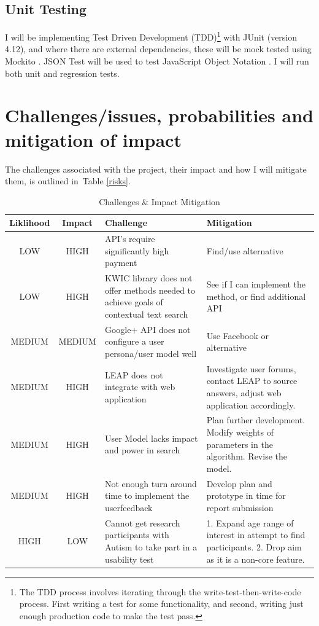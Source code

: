 \documentclass[a4paper, 11pt]{article}
\begin{document}
\begin{justify}
\subsection{Unit Testing}
I will be implementing Test Driven Development (TDD)\footnote{The TDD process involves iterating through the write-test-then-write-code process. First writing a test for some functionality, and second, writing just enough production code to make the test pass.} with JUnit (version 4.12), and where there are external dependencies, these will be mock tested using Mockito \cite{mockito}. JSON Test will be used to test JavaScript Object Notation \cite{jsontest}. I will run both unit and regression tests.

\section{Challenges/issues, probabilities and mitigation of impact}
The challenges associated with the project, their impact and how I will mitigate them, is outlined in~Table \ref{risks}. 
\begin{table}[H]
\caption{Challenges \& Impact Mitigation} 
\centering
\begin{tabular}{|c | c | p{6cm} | p{6cm} |}
\hline\hline 
Liklihood & Impact & Challenge & Mitigation\\ [0.5ex]
\hline 
LOW & HIGH & API's require significantly high payment & Find/use alternative\\
\hline 
LOW & HIGH & KWIC library does not offer methods needed to achieve goals of contextual text search & See if I can implement the method, or find additional API\\
\hline 
MEDIUM & MEDIUM & Google+ API does not configure a user persona/user model well & Use Facebook or alternative\\
\hline 
MEDIUM & HIGH & LEAP does not integrate with web application & Investigate user forums, contact LEAP to source answers, adjust web application accordingly.\\
\hline
MEDIUM & HIGH & User Model lacks impact and power in search & Plan further development. Modify weights of parameters in the algorithm. Revise the model. \\
\hline 
MEDIUM & HIGH & Not enough turn around time to implement the userfeedback & Develop plan and prototype in time for report submission\\
\hline
HIGH & LOW & Cannot get research participants with Autism to take part in a usability test & 1. Expand age range of interest in attempt to find participants. 2. Drop aim as it is a non-core feature.\\ 
\hline


\end{tabular}
\end{table}
\end{justify}
\end{document}
